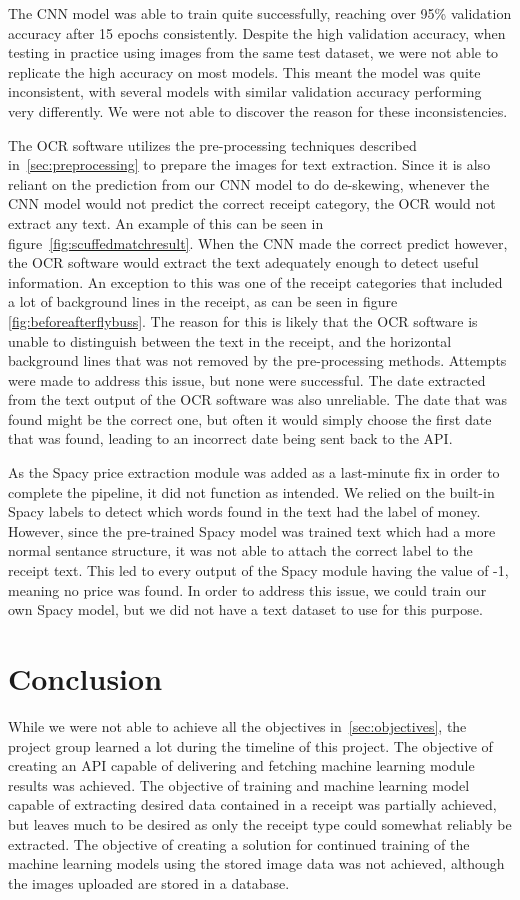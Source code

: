 The CNN model was able to train quite successfully, reaching over 95\% validation accuracy after 15 epochs consistently.
Despite the high validation accuracy, when testing in practice using images from the same test dataset, we were not able to replicate the high accuracy on most models.
This meant the model was quite inconsistent, with several models with similar validation accuracy performing very differently.
We were not able to discover the reason for these inconsistencies.

The OCR software utilizes the pre-processing techniques described in~\ref{sec:preprocessing} to prepare the images
for text extraction.
Since it is also reliant on the prediction from our CNN model to do de-skewing, whenever the CNN model would not predict the correct receipt category, the OCR would not extract any text.
An example of this can be seen in figure~\ref{fig:scuffedmatchresult}.
When the CNN made the correct predict however, the OCR software would extract the text adequately enough to detect useful information.
An exception to this was one of the receipt categories that included a lot of background lines in the receipt, as can be seen in figure \ref{fig:beforeafterflybuss}.
The reason for this is likely that the OCR software is unable to distinguish between the text in the receipt, and the horizontal background lines that was not removed by the pre-processing methods.
Attempts were made to address this issue, but none were successful.
The date extracted from the text output of the OCR software was also unreliable.
The date that was found might be the correct one, but often it would simply choose the first date that was found, leading to an incorrect date being sent back to the API.

As the Spacy price extraction module was added as a last-minute fix in order to complete the pipeline, it did not function as intended.
We relied on the built-in Spacy labels to detect which words found in the text had the label of money.
However, since the pre-trained Spacy model was trained text which had a more normal sentance structure, it was not able to attach the correct label to the receipt text.
This led to every output of the Spacy module having the value of -1, meaning no price was found.
In order to address this issue, we could train our own Spacy model, but we did not have a text dataset to use for this purpose.

\section{Conclusion}\label{sec:conclusion}
While we were not able to achieve all the objectives in~\ref{sec:objectives}, the project group learned a lot during
the timeline of this project.
The objective of creating an API capable of delivering and fetching machine learning module results was achieved.
The objective of training and machine learning model capable of extracting desired data contained in a receipt was partially achieved, but leaves much to be desired as only the receipt type could somewhat reliably be extracted.
The objective of creating a solution for continued training of the machine learning models using the stored image data was not achieved, although the images uploaded are stored in a database.

